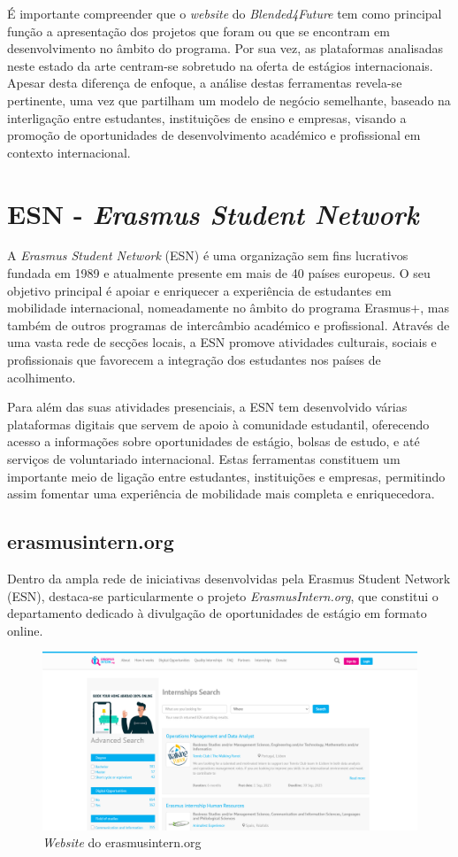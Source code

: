 É importante compreender que o \textit{website} do \textit{Blended4Future} tem como principal função a apresentação dos projetos que foram ou que se encontram em desenvolvimento no âmbito do programa. Por sua vez, as plataformas analisadas neste estado da arte centram-se sobretudo na oferta de estágios internacionais. Apesar desta diferença de enfoque, a análise destas ferramentas revela-se pertinente, uma vez que partilham um modelo de negócio semelhante, baseado na interligação entre estudantes, instituições de ensino e empresas, visando a promoção de oportunidades de desenvolvimento académico e profissional em contexto internacional.

\section{ESN - \textit{Erasmus Student Network}}

A \textit{Erasmus Student Network} (ESN) é uma organização sem fins lucrativos fundada em 1989 e atualmente presente em mais de 40 países europeus. O seu objetivo principal é apoiar e enriquecer a experiência de estudantes em mobilidade internacional, nomeadamente no âmbito do programa Erasmus+, mas também de outros programas de intercâmbio académico e profissional. Através de uma vasta rede de secções locais, a ESN promove atividades culturais, sociais e profissionais que favorecem a integração dos estudantes nos países de acolhimento.

Para além das suas atividades presenciais, a ESN tem desenvolvido várias plataformas digitais que servem de apoio à comunidade estudantil, oferecendo acesso a informações sobre oportunidades de estágio, bolsas de estudo, e até serviços de voluntariado internacional. Estas ferramentas constituem um importante meio de ligação entre estudantes, instituições e empresas, permitindo assim fomentar uma experiência de mobilidade mais completa e enriquecedora.

\subsection{erasmusintern.org}

Dentro da ampla rede de iniciativas desenvolvidas pela Erasmus Student Network (ESN), destaca-se particularmente o projeto \textit{ErasmusIntern.org}, que constitui o departamento dedicado à divulgação de oportunidades de estágio em formato online.

\begin{figure}[h!tbp]
    \centering
    \includegraphics[width=0.7\linewidth]{capitulos/cap2-estadodaarte/assets/image/esn/internship-org.png}
    \caption{\textit{Website} do erasmusintern.org}
    \label{fig:erasmus-intern-homepage}
\end{figure}

